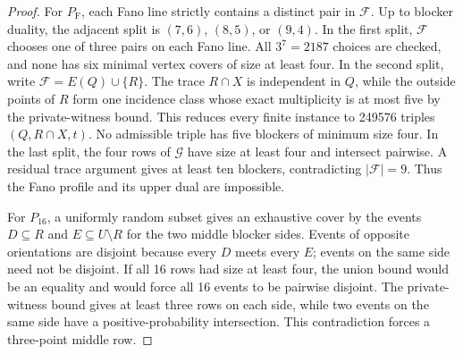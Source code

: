 \documentclass[a4paper,fleqn,longmktitle]{cas-sc}
\theoremstyle{definition}
\theoremstyle{remark}
\begin{document}
\begin{proof}
For $P_{\mathrm F}$, each Fano line strictly contains a distinct pair in
$\mathcal F$.  Up to blocker duality, the adjacent split is $(7,6)$,
$(8,5)$, or $(9,4)$.  In the first split, $\mathcal F$ chooses one of three
pairs on each Fano line.  All $3^7=2187$ choices are checked, and none has six
minimal vertex covers of size at least four.  In the second split, write
$\mathcal F=E(Q)\cup\{R\}$.  The trace $R\cap X$ is independent in $Q$, while
the outside points of $R$ form one incidence class whose exact multiplicity
is at most five by the private-witness bound.  This reduces every finite
instance to 249576 triples $(Q,R\cap X,t)$.  No admissible triple has five
blockers of minimum size four.  In the last split, the four rows of
$\mathcal G$ have size at least four and intersect pairwise.  A residual trace
argument gives at least ten blockers, contradicting $|\mathcal F|=9$.
Thus the Fano profile and its upper dual are impossible.

For $P_{16}$, a uniformly random subset gives an exhaustive cover by the
events $D\subseteq R$ and $E\subseteq U\setminus R$ for the two middle
blocker sides.  Events of opposite orientations are disjoint because every
$D$ meets every $E$; events on the same side need not be disjoint.  If all 16
rows had size at least four, the union bound would be an equality and would
force all 16 events to be pairwise disjoint.  The private-witness bound gives
at least three rows on each side, while two events on the same side have a
positive-probability intersection.  This contradiction forces a three-point
middle row.


\end{proof}
\end{document}
